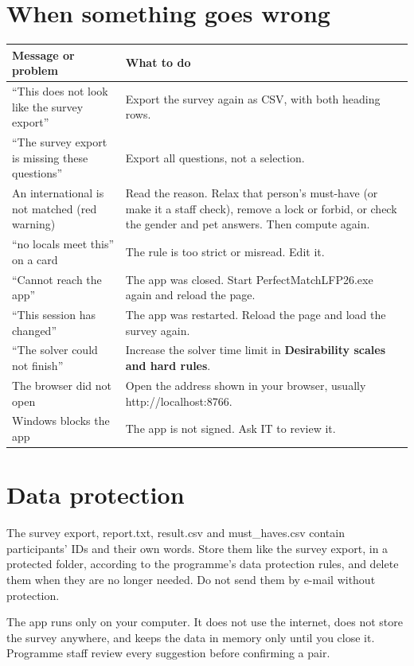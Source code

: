 \documentclass[11pt,a4paper]{article}
\newcommand{\ui}[1]{\textbf{#1}}
\begin{document}
\section{When something goes wrong}
{\small
\begin{tabularx}{\textwidth}{@{}>{\raggedright\arraybackslash}p{5.4cm}X@{}}
\toprule
Message or problem & What to do \\
\midrule
``This does not look like the survey export'' & Export the survey again as CSV, with both heading rows. \\
``The survey export is missing these questions'' & Export all questions, not a selection. \\
An international is not matched (red warning) & Read the reason. Relax that person's must-have (or make it a staff check),
  remove a lock or forbid, or check the gender and pet answers. Then compute again. \\
``no locals meet this'' on a card & The rule is too strict or misread. Edit it. \\
``Cannot reach the app'' & The app was closed. Start PerfectMatchLFP26.exe again and reload the page. \\
``This session has changed'' & The app was restarted. Reload the page and load the survey again. \\
``The solver could not finish'' & Increase the solver time limit in \ui{Desirability scales and hard rules}. \\
The browser did not open & Open the address shown in your browser, usually http://localhost:8766. \\
Windows blocks the app & The app is not signed. Ask IT to review it. \\
\bottomrule
\end{tabularx}}

\section{Data protection}
\begin{caution}
The survey export, report.txt, result.csv and must\_haves.csv contain participants' IDs and their own words.
Store them like the survey export, in a protected folder, according to the programme's data protection rules,
and delete them when they are no longer needed. Do not send them by e-mail without protection.
\end{caution}
The app runs only on your computer. It does not use the internet, does not store the survey anywhere, and
keeps the data in memory only until you close it. Programme staff review every suggestion before confirming
a pair.
\end{document}
